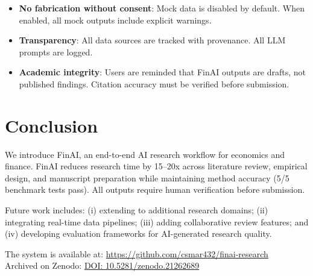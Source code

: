 \documentclass[12pt, a4paper]{article}
\begin{document}
\begin{itemize}
    \item \textbf{No fabrication without consent}: Mock data is disabled by default. When enabled, all mock outputs include explicit warnings.
    \item \textbf{Transparency}: All data sources are tracked with provenance. All LLM prompts are logged.
    \item \textbf{Academic integrity}: Users are reminded that FinAI outputs are drafts, not published findings. Citation accuracy must be verified before submission.
\end{itemize}

\section{Conclusion}

We introduce FinAI, an end-to-end AI research workflow for economics and finance. FinAI reduces research time by 15--20x across literature review, empirical design, and manuscript preparation while maintaining method accuracy (5/5 benchmark tests pass). All outputs require human verification before submission.

Future work includes: (i) extending to additional research domains; (ii) integrating real-time data pipelines; (iii) adding collaborative review features; and (iv) developing evaluation frameworks for AI-generated research quality.

The system is available at: \url{https://github.com/csmar432/finai-research} \\
Archived on Zenodo: \href{https://doi.org/10.5281/zenodo.21262689}{DOI: 10.5281/zenodo.21262689}

\newpage

\end{document}
